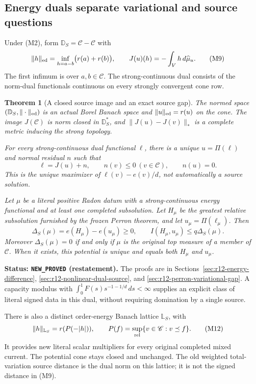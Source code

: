 \documentclass[11pt,a4paper]{article}
\numberwithin{equation}{section}
\newtheorem{theorem}{Theorem}[section]
\theoremstyle{definition}
\theoremstyle{remark}
\begin{document}
\subsection{Energy duals separate variational and source questions}

Under (M2), form $\mathbb D_S=\mathscr C-\mathscr C$ with
\[
 \|h\|_{\rm ed}
     =\inf_{h=a-b}\bigl(r(a)+r(b)\bigr),\qquad
 J(u)(h)=-\int_V h\,d\widehat\mu_u.
 \tag{M9}
\]
The first infimum is over $a,b\in\mathscr C$.
The strong-continuous dual consists of the norm-dual functionals
continuous on every strongly convergent cone row.

\begin{theorem}[A closed source image and an exact source gap]
\label{thm:r12-main-energy-source}
The normed space $(\mathbb D_S,\|\cdot\|_{\rm ed})$ is an
actual Borel Banach space and $\|u\|_{\rm ed}=r(u)$ on the cone.
The image $J(\mathscr C)$ is norm closed in $\mathbb D_S^*$, and
$\|J(u)-J(v)\|_*$ is a complete metric inducing the strong topology.

For every strong-continuous dual functional $\ell$, there is a
unique $u=\Pi(\ell)$ and normal residual $n$ such that
\[
 \ell=J(u)+n,\qquad n(v)\leq0\ (v\in\mathscr C),\qquad n(u)=0.
 \tag{M10}
\]
This is the unique maximizer of $\ell(v)-e(v)/d$, not automatically
a source solution.

Let $\mu$ be a literal positive Radon datum with a strong-continuous
energy functional and at least one completed subsolution.
Let $H_\mu$ be the greatest relative subsolution furnished by
the frozen Perron theorem, and let $u_\mu=\Pi(\ell_\mu)$. Then
\[
 \Delta_S(\mu)=e(H_\mu)-e(u_\mu)\geq0,\qquad
 I(H_\mu,u_\mu)\leq q\Delta_S(\mu).
 \tag{M11}
\]
Moreover $\Delta_S(\mu)=0$ if and only if $\mu$ is the original
top measure of a member of $\mathscr C$. When it exists, this
potential is unique and equals both $H_\mu$ and $u_\mu$.
\end{theorem}

\noindent\textbf{Status: \texttt{NEW\_PROVED} (restatement).}
The proofs are in
Sections~\ref{sec:r12-energy-difference},
\ref{sec:r12-nonlinear-dual-source}, and
\ref{sec:r12-perron-variational-gap}.
A capacity modulus with
$\int_0^1 F(s)s^{-1-1/d}\,ds<\infty$ supplies an explicit
class of literal signed data in this dual, without requiring
domination by a single source.

There is also a distinct order-energy Banach lattice $\mathbb L_S$,
with
\[
 \|h\|_{\mathbb L_S}
       =r(P(-|h|)),\qquad
 P(f)=\sup_{\rm rel}\{v\in\mathscr C:v\preceq f\}.
 \tag{M12}
\]
It provides new literal scalar multipliers for every original
completed mixed current. The potential cone stays closed and
unchanged. The old weighted total-variation source distance is
the dual norm on this lattice; it is not the signed distance
in (M9).
\end{document}

